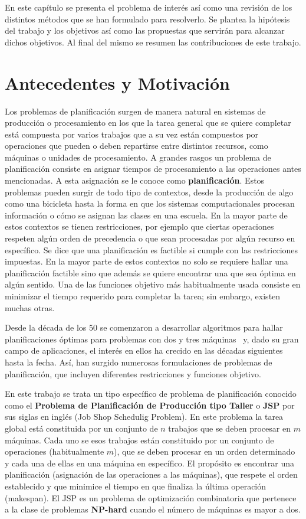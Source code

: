 En este capítulo se presenta el problema de interés así como una revisión de los distintos métodos que se han formulado para resolverlo. 
%
Se plantea la hipótesis del trabajo y los objetivos así como las propuestas que servirán para alcanzar dichos objetivos. 
%
Al final del mismo se resumen las contribuciones de este trabajo.

\section{Antecedentes y Motivación}
Los problemas de planificación surgen de manera natural en sistemas de producción o procesamiento en los que la tarea general que se 
quiere completar está compuesta por varios trabajos que a su vez están compuestos por operaciones que pueden o deben repartirse entre distintos recursos, como máquinas o unidades de procesamiento. 
%
A grandes rasgos un problema de planificación consiste en asignar tiempos de procesamiento a las operaciones antes mencionadas. A esta asignación se le conoce como \textbf{planificación}.
%
Estos problemas pueden surgir de todo tipo de contextos, desde la producción de algo como una bicicleta hasta la forma en que los sistemas computacionales 
procesan información o cómo se asignan las clases en una escuela. 
%
En la mayor parte de estos contextos se tienen restricciones, por ejemplo que ciertas operaciones respeten algún orden de precedencia o que sean procesadas por algún recurso en específico. Se dice que una planificación es factible si cumple con las restricciones impuestas.
%
En la mayor parte de estos contextos no solo se requiere hallar una planificación factible sino que además se quiere 
encontrar una que sea óptima en algún sentido.
%
Una de las funciones objetivo más habitualmente usada consiste en minimizar el tiempo requerido para completar la tarea; sin embargo, existen muchas otras.

Desde la década de los 50 se comenzaron a desarrollar algoritmos para hallar planificaciones óptimas para problemas con dos y tres máquinas~\cite{johnson1954optimal}
y, dado su gran campo de aplicaciones, el interés en ellos ha crecido en las décadas siguientes hasta la fecha.
%
Así, han surgido numerosas formulaciones de problemas de planificación, que incluyen diferentes restricciones y funciones objetivo.
 
En este trabajo se trata un tipo específico de problema de planificación conocido como el \textbf{Problema de Planificación de Producción tipo Taller} o \textbf{JSP} por sus 
siglas en inglés (Job Shop Schedulig Problem). 
%
En este problema la tarea global está constituida por un conjunto de $n$ trabajos que se deben procesar en $m$ máquinas. 
%
Cada uno se esos trabajos están constituido por un conjunto de operaciones (habitualmente $m$), que se deben procesar en un orden determinado y cada una de ellas
en una máquina en específico.
%
El propósito es encontrar una planificación (asignación de las operaciones a las máquinas), que respete el orden establecido y que minimice el tiempo en que finaliza
la última operación (makespan).
%
El JSP es un problema de optimización combinatoria que pertenece a la clase de problemas \textbf{NP-hard} cuando el número de máquinas es mayor a dos\cite{garey1976complexity}.

